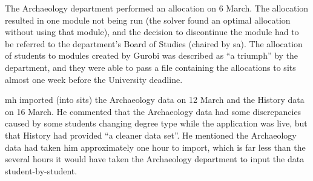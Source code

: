The Archaeology department performed an allocation on 6 March. The allocation
resulted in one module not being run (the solver found an optimal allocation
without using that module), and the decision to discontinue the module had to
be referred to the department's Board of Studies (chaired by \gls{sa}). The
allocation of students to modules created by Gurobi was described as ``a
triumph'' by the department, and they were able to pass a file containing the
allocations to \gls{sits} almost one week before the University deadline.

\Gls{mh} imported (into \gls{sits}) the Archaeology data on 12 March and the
History data on 16 March. He commented that the Archaeology data had some
discrepancies caused by some students changing degree type while the
application was live, but that History had provided ``a cleaner data set''. He
mentioned the Archaeology data had taken him approximately one hour to import,
which is far less than the several hours it would have taken the Archaeology
department to input the data student-by-student.
